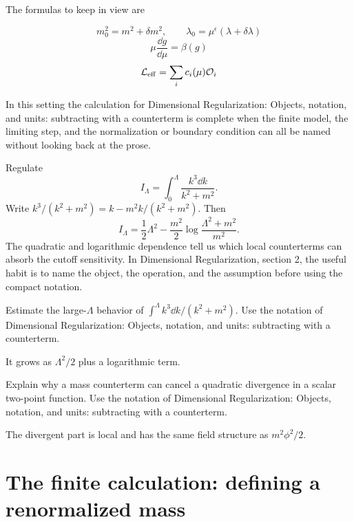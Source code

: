 The formulas to keep in view are

\[
  m_0^2=m^2+\delta m^2,\qquad \lambda_0=\mu^\epsilon(\lambda+\delta\lambda)
\]
\[
  \mu\frac{\dd g}{\dd\mu}=\beta(g)
\]
\[
  \mathcal L_{\mathrm{eff}}=\sum_i c_i(\mu)\mathcal O_i
\]

In this setting the calculation for Dimensional Regularization: Objects, notation, and units: subtracting with a counterterm is complete when the finite model, the limiting step, and the normalization or boundary condition can all be named without looking back at the prose.




\begin{example}
Regulate
\[
  I_\Lambda=\int_0^\Lambda\frac{k^3\dd k}{k^2+m^2}.
\]
Write \(k^3/(k^2+m^2)=k-m^2k/(k^2+m^2)\).  Then
\[
  I_\Lambda=\frac12\Lambda^2-\frac{m^2}{2}\log\frac{\Lambda^2+m^2}{m^2}.
\]
The quadratic and logarithmic dependence tell us which local counterterms can absorb the cutoff sensitivity.  In Dimensional Regularization, section 2, the useful habit is to name the object, the operation, and the assumption before using the compact notation.
\end{example}



\begin{exercise}
Estimate the large-\(\Lambda\) behavior of \(\int^\Lambda k^3\dd k/(k^2+m^2)\).  Use the notation of Dimensional Regularization: Objects, notation, and units: subtracting with a counterterm.
\begin{answer}
It grows as \(\Lambda^2/2\) plus a logarithmic term.
\end{answer}
\end{exercise}

\begin{exercise}
Explain why a mass counterterm can cancel a quadratic divergence in a scalar two-point function.  Use the notation of Dimensional Regularization: Objects, notation, and units: subtracting with a counterterm.
\begin{answer}
The divergent part is local and has the same field structure as \(m^2\phi^2/2\).
\end{answer}
\end{exercise}



\section{The finite calculation: defining a renormalized mass}


